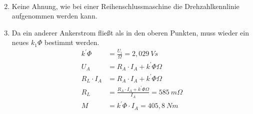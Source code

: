 \begin{solution}
\begin{enumerate}
\begin{align}
\end{align}
\item Keine Ahnung, wie bei einer Reihenschlussmaschine die Drehzahlkennlinie aufgenommen werden kann.
\item Da ein anderer Ankerstrom fließt als in den oberen Punkten, muss wieder ein neues $k_1 \Phi$ bestimmt werden.
\begin{align}
k^{'} \Phi &= \frac{U_i}{\Omega} = 2,029~Vs\\
U_A &= R_A \cdot I_A + k^{'} \Phi \Omega\\
R_L \cdot I_A &= R_A \cdot I_A + k^{'} \Phi \Omega\\
R_L &= \frac{R_A \cdot I_A + k^{'} \Phi \Omega}{I_A}=585~m\Omega\\
M &= k^{'} \Phi \cdot I_A = 405,8~Nm
\end{align}
\end{enumerate}
\end{solution}